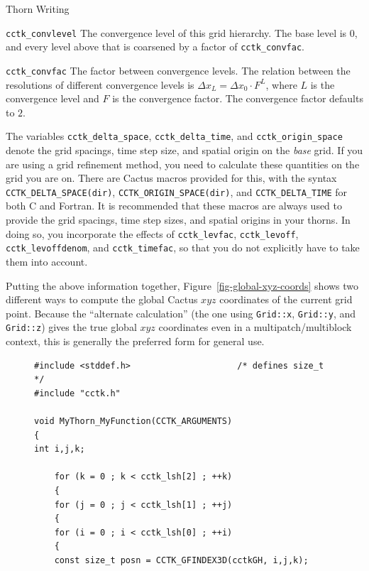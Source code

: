\begin{cactuspart}{Thorn Writing}
\begin{Lentry}
\item [\texttt{cctk\_convlevel}] The convergence level of this grid hierarchy.
        The base level is $0$, and every level above that is
        coarsened by a factor of \texttt{cctk\_convfac}.
\item [\texttt{cctk\_convfac}] The factor between convergence levels.
        The relation between the resolutions of different convergence
        levels is $\Delta x_L = \Delta x_0 \cdot F^L$, where $L$ is the
        convergence level and $F$ is the convergence factor.
        The convergence factor defaults to $2$.
\end{Lentry}

The variables \texttt{cctk\_delta\_space}, \texttt{cctk\_delta\_time}, and
\texttt{cctk\_origin\_space} denote the grid spacings, time step size,
and spatial origin on the \textit{base} grid.  If you are using a grid
refinement method, you need to calculate these quantities on the grid
you are on.  There are Cactus macros provided for this, with the
syntax \texttt{CCTK\_DELTA\_SPACE(dir)}, \texttt{CCTK\_ORIGIN\_SPACE(dir)},
and \texttt{CCTK\_DELTA\_TIME} for both C and Fortran.  It is recommended
that these macros are always used to provide the grid spacings, time
step sizes, and spatial origins in your thorns.  In doing so, you
incorporate the effects of \texttt{cctk\_levfac}, \texttt{cctk\_levoff},
\texttt{cctk\_levoffdenom}, and \texttt{cctk\_timefac}, so that you do not
explicitly have to take them into account.

Putting the above information together, Figure~\ref{fig-global-xyz-coords}
shows two different ways to compute the global Cactus $xyz$ coordinates
of the current grid point.  Because the ``alternate calculation'' (the
one using \verb|Grid::x|, \verb|Grid::y|, and \verb|Grid::z|) gives the
true global $xyz$ coordinates even in a multipatch/multiblock context,
this is generally the preferred form for general use.

\begin{figure}[bp]
\begin{verbatim}
#include <stddef.h>                     /* defines size_t */
#include "cctk.h"

void MyThorn_MyFunction(CCTK_ARGUMENTS)
{
int i,j,k;

    for (k = 0 ; k < cctk_lsh[2] ; ++k)
    {
    for (j = 0 ; j < cctk_lsh[1] ; ++j)
    {
    for (i = 0 ; i < cctk_lsh[0] ; ++i)
    {
    const size_t posn = CCTK_GFINDEX3D(cctkGH, i,j,k);


\end{verbatim}
\end{figure}
\end{cactuspart}
